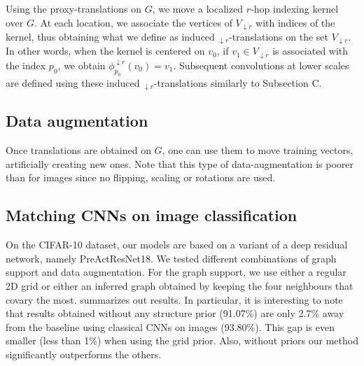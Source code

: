 Using the proxy-translations on $G$, we move a localized $r$-hop indexing kernel over $G$. At each location, we associate the vertices of $V_{\downarrow r}$ with indices of the kernel, thus obtaining what we define as induced $_{\downarrow r}$-translations on the set $V_{\downarrow r}$. In other words, when the kernel is centered on $v_0$, if $v_1 \in V_{\downarrow r}$ is associated with the index $p_0$, we obtain $\phi_{p_0}^{\downarrow r}(v_0) = v_1$. Subsequent convolutions at lower scales are defined using these induced $_{\downarrow r}$-translations similarly to Subsection C.




\subsection{Data augmentation}

Once translations are obtained on $G$, one can use them to move training vectors, artificially creating new ones. Note that this type of data-augmentation is poorer than for images since no flipping, scaling or rotations are used.

\subsection{Matching CNNs on image classification}

On the CIFAR-10 dataset, our models are based on a variant of a deep residual network, namely PreActResNet18\cite{he2016identity}. We tested different combinations of graph support and data augmentation. For the graph support, we use either a regular 2D grid or either an inferred graph obtained by keeping the four neighbours that covary the most.  summarizes out results. In particular, it is interesting to note that results obtained without any structure prior (91.07\%) are only 2.7\% away from the baseline using classical CNNs on images (93.80\%). This gap is even smaller (less than 1\%) when using the grid prior. Also, without priors our method significantly outperforms the others. %

